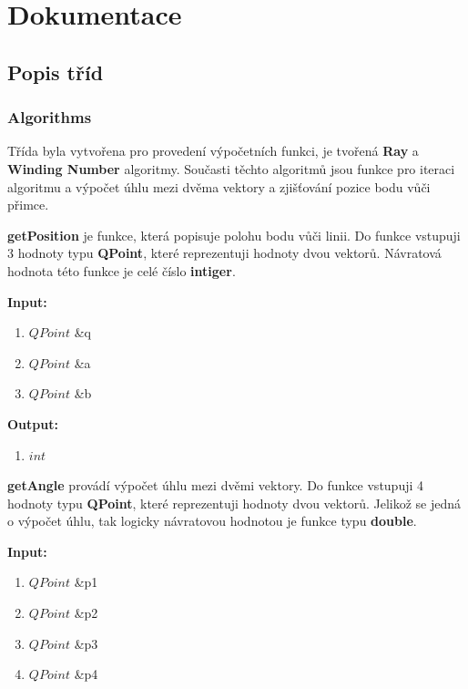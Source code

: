 \documentclass{article}
\begin{document}
\newpage 

 

\section{Dokumentace} 

 

\subsection{Popis tříd} 

 

\subsubsection{Algorithms} 


 

Třída byla vytvořena pro provedení výpočetních funkci, je tvořená \textbf{Ray} a \textbf{Winding Number} algoritmy. Současti těchto algoritmů jsou funkce pro iteraci algoritmu a výpočet úhlu mezi dvěma vektory a zjišťování pozice bodu vůči přimce.\\ 

\bigskip 

\textbf{getPosition} je funkce, která popisuje polohu bodu vůči linii. Do funkce vstupuji 3 hodnoty typu  \textbf{QPoint}, které reprezentuji hodnoty dvou vektorů. Návratová hodnota této funkce je celé číslo \textbf{intiger}.\\ 
\bigskip 

\textbf{Input:}
\begin{enumerate} 
\item $QPoint$ \&q
\item $QPoint$ \&a
\item $QPoint$ \&b
\end{enumerate}

\bigskip 
\textbf{Output:}
\begin{enumerate} 
\item $int$
\end{enumerate}

\bigskip 

\textbf{getAngle} provádí výpočet úhlu mezi dvěmi vektory. Do funkce vstupuji 4 hodnoty typu \textbf{QPoint}, které reprezentuji hodnoty dvou vektorů. Jelikož se jedná o výpočet úhlu, tak logicky návratovou hodnotou 
je funkce typu \textbf{double}.\\ 
\bigskip 

\textbf{Input:}
\begin{enumerate} 
\item $QPoint$ \&p1
\item $QPoint$ \&p2
\item $QPoint$ \&p3
\item $QPoint$ \&p4
\end{enumerate}
\end{document}
